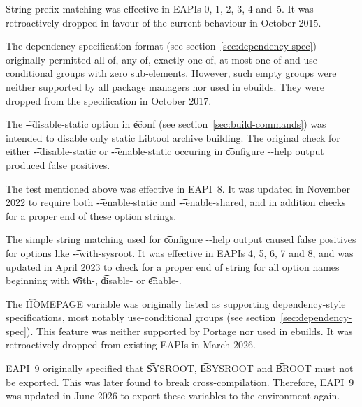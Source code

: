 \begin{description}
String prefix matching was effective in EAPIs 0, 1, 2, 3, 4 and~5. It was retroactively dropped
in favour of the current behaviour in October 2015.

\item[Empty dependency groups]
The dependency specification format (see section~\ref{sec:dependency-spec}) originally permitted
all-of, any-of, exactly-one-of, at-most-one-of and use-conditional groups with zero sub-elements.
However, such empty groups were neither supported by all package managers nor used in ebuilds.
They were dropped from the specification in October 2017.

\item[econf -{}-disable-static option]
The \t{-{}-disable-static} option in \t{econf} (see section~\ref{sec:build-commands}) was intended
to disable only static Libtool archive building. The original check for either
\t{-{}-disable-static} or \t{-{}-enable-static} occuring in \t{configure -{}-help} output produced
false positives.

The test mentioned above was effective in EAPI~8. It was updated in November 2022 to require both
\t{-{}-enable-static} and \t{-{}-enable-shared}, and in addition checks for a proper end of these
option strings.

\item[econf matches configure -{}-help output better]
The simple string matching used for \t{configure -{}-help} output caused false positives for options
like \t{-{}-with-sysroot}. It was effective in EAPIs 4, 5, 6, 7 and 8, and was updated in April 2023
to check for a proper end of string for all option names beginning with \t{with-}, \t{disable-} or
\t{enable-}.

\item[Dependency groups in HOMEPAGE]
The \t{HOMEPAGE} variable was originally listed as supporting dependency-style specifications,
most notably use-conditional groups (see section~\ref{sec:dependency-spec}). This feature was
neither supported by Portage nor used in ebuilds. It was retroactively dropped from existing EAPIs
in March 2026.

\item[Path variables re-exported to environment]
EAPI~9 originally specified that \t{SYSROOT}, \t{ESYSROOT} and \t{BROOT} must not be exported.
This was later found to break cross-compilation. Therefore, EAPI~9 was updated in June 2026 to
export these variables to the environment again.

\end{description}


